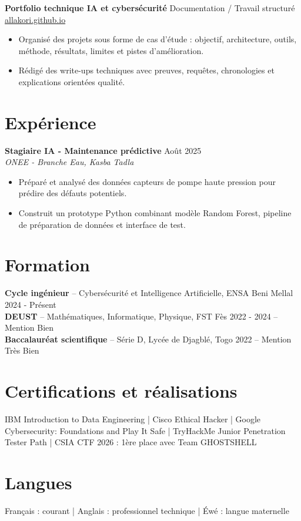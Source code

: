 \documentclass[10pt,a4paper]{article}
\newcommand{\role}[3]{%
  \textbf{#1} \hfill #3\\
  \textit{#2}\vspace{1pt}
}
\newcommand{\edu}[4]{%
  \textbf{#1} -- #2 \hfill #3 #4\\[-1pt]
}
\begin{document}
\textbf{Portfolio technique IA et cybersécurité} \hfill Documentation / Travail structuré\\
\href{https://allakori.github.io/}{allakori.github.io}
\begin{itemize}
  \item Organisé des projets sous forme de cas d'étude : objectif, architecture, outils, méthode, résultats, limites et pistes d'amélioration.
  \item Rédigé des write-ups techniques avec preuves, requêtes, chronologies et explications orientées qualité.
\end{itemize}

\section{Expérience}
\role{Stagiaire IA - Maintenance prédictive}{ONEE - Branche Eau, Kasba Tadla}{Août 2025}
\begin{itemize}
  \item Préparé et analysé des données capteurs de pompe haute pression pour prédire des défauts potentiels.
  \item Construit un prototype Python combinant modèle Random Forest, pipeline de préparation de données et interface de test.
\end{itemize}

\section{Formation}
\edu{Cycle ingénieur}{Cybersécurité et Intelligence Artificielle, ENSA Beni Mellal}{2024 - Présent}{}
\edu{DEUST}{Mathématiques, Informatique, Physique, FST Fès}{2022 - 2024}{-- Mention Bien}
\edu{Baccalauréat scientifique}{Série D, Lycée de Djagblé, Togo}{2022}{-- Mention Très Bien}

\section{Certifications et réalisations}
IBM Introduction to Data Engineering | Cisco Ethical Hacker | Google Cybersecurity: Foundations and Play It Safe | TryHackMe Junior Penetration Tester Path | CSIA CTF 2026 : 1ère place avec Team GHOSTSHELL

\section{Langues}
Français : courant | Anglais : professionnel technique | Éwé : langue maternelle
\end{document}
